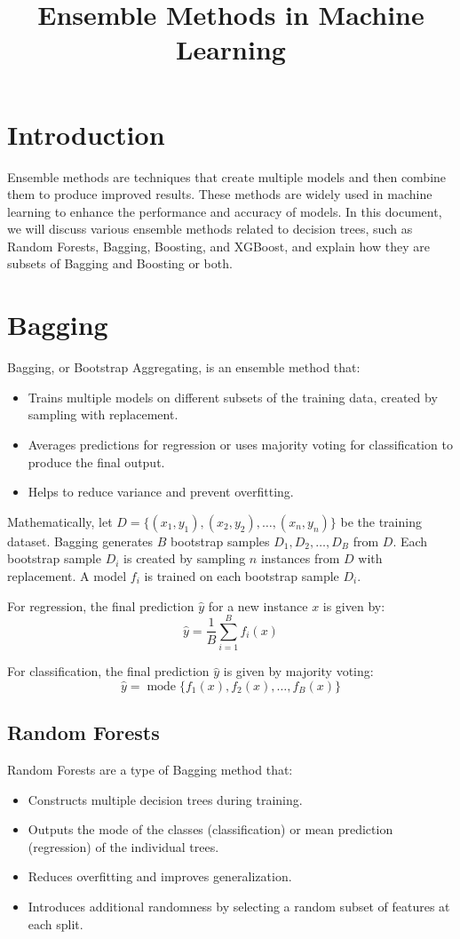 \documentclass[12pt]{article}
\title{Ensemble Methods in Machine Learning}
\author{}
\date{}
\begin{document}
\maketitle

\section{Introduction}
Ensemble methods are techniques that create multiple models and then combine them to produce improved results. These methods are widely used in machine learning to enhance the performance and accuracy of models. In this document, we will discuss various ensemble methods related to decision trees, such as Random Forests, Bagging, Boosting, and XGBoost, and explain how they are subsets of Bagging and Boosting or both.

\section{Bagging}
Bagging, or Bootstrap Aggregating, is an ensemble method that:
\begin{itemize}
    \item Trains multiple models on different subsets of the training data, created by sampling with replacement.
    \item Averages predictions for regression or uses majority voting for classification to produce the final output.
    \item Helps to reduce variance and prevent overfitting.
\end{itemize}

Mathematically, let \( D = \{(x_1, y_1), (x_2, y_2), \ldots, (x_n, y_n)\} \) be the training dataset. Bagging generates \( B \) bootstrap samples \( D_1, D_2, \ldots, D_B \) from \( D \). Each bootstrap sample \( D_i \) is created by sampling \( n \) instances from \( D \) with replacement. A model \( f_i \) is trained on each bootstrap sample \( D_i \).

For regression, the final prediction \( \hat{y} \) for a new instance \( x \) is given by:
\[
\hat{y} = \frac{1}{B} \sum_{i=1}^{B} f_i(x)
\]

For classification, the final prediction \( \hat{y} \) is given by majority voting:
\[
\hat{y} = \operatorname{mode} \{ f_1(x), f_2(x), \ldots, f_B(x) \}
\]

\subsection{Random Forests}
Random Forests are a type of Bagging method that:
\begin{itemize}
    \item Constructs multiple decision trees during training.
    \item Outputs the mode of the classes (classification) or mean prediction (regression) of the individual trees.
    \item Reduces overfitting and improves generalization.
    \item Introduces additional randomness by selecting a random subset of features at each split.
\end{itemize}
\end{document}
